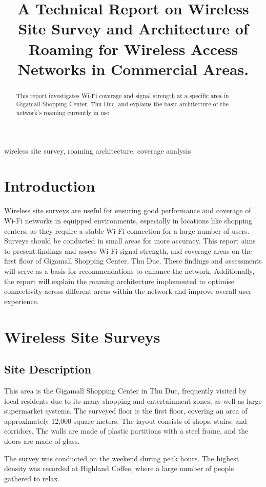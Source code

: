 \documentclass[conference]{IEEEtran}
\title{A Technical Report on Wireless Site Survey and Architecture of Roaming for Wireless Access Networks in Commercial Areas.}
\author{
    \IEEEauthorblockN{Nguyen Duc Chi Dat}
    \IEEEauthorblockA{
        \textit{Faculty of Information Security,} \\
        \textit{University of Information Technology}\\ 
        Ho Chi Minh City, Viet Nam \\
        datndc.19@grad.uit.edu.vn
    }
}
\begin{document}
\maketitle

\begin{abstract}
This report investigates Wi-Fi coverage and signal strength at a specific area in Gigamall Shopping Center, Thu Duc, and explains the basic architecture of the network's roaming currently in use.
\end{abstract}

\begin{IEEEkeywords}
wireless site survey, roaming architecture, coverage analysis
\end{IEEEkeywords}

\section{Introduction}
Wireless site surveys are useful for ensuring good performance and coverage of Wi-Fi networks in equipped environments, especially in locations like shopping centers, as they require a stable Wi-Fi connection for a large number of users. Surveys should be conducted in small areas for more accuracy. This report aims to present findings and assess Wi-Fi signal strength, and coverage areas on the first floor of Gigamall Shopping Center, Thu Duc. These findings and assessments will serve as a basis for recommendations to enhance the network. Additionally, the report will explain the roaming architecture implemented to optimise connectivity across different areas within the network and improve overall user experience.
\section{Wireless Site Surveys}

\subsection{Site Description}
This area is the Gigamall Shopping Center in Thu Duc, frequently visited by local residents due to its many shopping and entertainment zones, as well as large supermarket systems. The surveyed floor is the first floor, covering an area of approximately 12,000 square meters. The layout consists of shops, stairs, and corridors. The walls are made of plastic partitions with a steel frame, and the doors are made of glass.

The survey was conducted on the weekend during peak hours. The highest density was recorded at Highland Coffee, where a large number of people gathered to relax.
\end{document}
